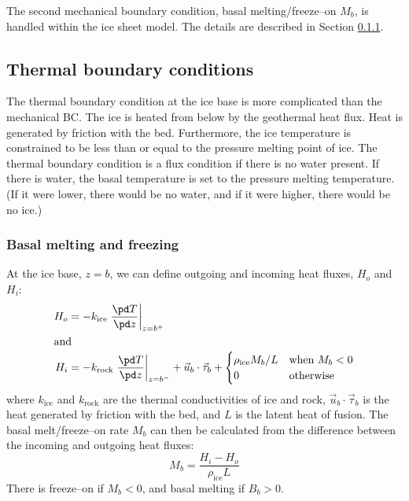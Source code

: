 The second mechanical boundary condition, basal melting/freeze--on $M_b$, is handled within the ice sheet model. The details are described in Section \ref{num.sec.bc_melt}.

\subsection{Thermal boundary conditions}
\label{sc:glide_thermal_bc}
The thermal boundary condition at the ice base is more complicated than the mechanical BC. The ice is heated from below by the geothermal heat flux. Heat is generated by friction with the bed. Furthermore, the ice temperature is constrained to be less than or equal to the pressure melting point of ice. The thermal boundary condition is a flux condition if there is no water present. If there is water, the basal temperature is set to the pressure melting temperature. (If it were lower, there would be no water, and if it were higher, there would be no ice.)

\subsubsection{Basal melting and freezing}\label{num.sec.bc_melt}
At the ice base, $z=b$, we can define outgoing and incoming heat fluxes, $H_o$ and $H_i$:
\begin{subequations}
  \begin{align}
    H_o&=-k_{\text{ice}}\left.\frac{\pd T}{\pd z}\right|_{z=b^+}\\
    \intertext{and}
    H_i&=-k_{\text{rock}}\left.\frac{\pd T}{\pd z}\right|_{z=b^-}+\vec{u}_b\cdot\vec{\tau}_b+
    \begin{cases}
      {\rho_{\text{ice}}M_b}/{L} & \text{when $M_b<0$} \\
      0 & \text{otherwise}
    \end{cases}
  \end{align}
\end{subequations}
where $k_{\text{ice}}$ and $k_{\text{rock}}$ are the thermal conductivities of ice and rock, $\vec{u}_b\cdot\vec{\tau}_b$ is the heat generated by friction with the bed, and $L$ is the latent heat of fusion. The basal melt/freeze--on rate $M_b$ can then be calculated from the difference between the incoming and outgoing heat fluxes:
\begin{equation}
  \label{bc.eq.meltrate}
  M_b=\frac{H_i-H_o}{\rho_{\text{ice}}L}
\end{equation}
There is freeze--on if $M_b < 0$, and basal melting if $B_b > 0$.

